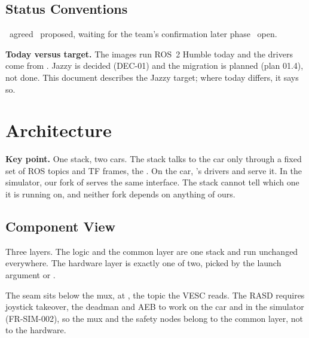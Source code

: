 \documentclass[11pt,a4paper]{article}
\newcommand{\prop}{\target{Proposed}}
\begin{document}
\subsection{Status Conventions}
\dec\ agreed \quad \prop\ proposed, waiting for the team's confirmation \quad {} later phase \quad \tbd\ open.

\begin{caveat}
\textbf{Today versus target.} The images run ROS~2 Humble today and the drivers come from . Jazzy is decided (DEC-01) and the migration is planned (plan 01.4), not done. This document describes the Jazzy target; where today differs, it says so.
\end{caveat}

\section{Architecture}\label{sec:arch}
\begin{takeaway}
\textbf{Key point.} One stack, two cars. The stack talks to the car only through a fixed set of ROS topics and TF frames, the . On the car, 's drivers and  serve it. In the simulator, our fork of  serves the same interface. The stack cannot tell which one it is running on, and neither fork depends on anything of ours. \prop
\end{takeaway}

\subsection{Component View}
Three layers. The logic and the common layer are one stack and run unchanged everywhere. The hardware layer is exactly one of two, picked by the launch argument  or .

The seam sits below the mux, at , the topic the VESC reads. The RASD requires joystick takeover, the deadman and AEB to work on the car and in the simulator (FR-SIM-002), so the mux and the safety nodes belong to the common layer, not to the hardware.
\end{document}
